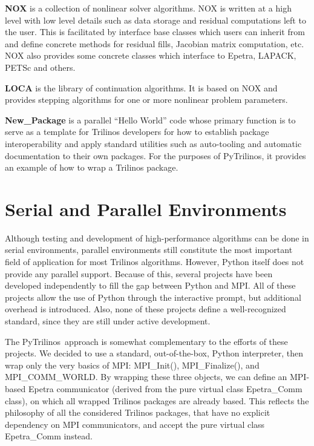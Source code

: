 \documentclass{llncs}
\newcommand{\PyTrilinos}{{\sc PyTrilinos}}
\begin{document}
\smallskip

\noindent
{\bf NOX} is a collection of nonlinear solver algorithms.  NOX
  is written at a high level with low level details such as data
  storage and residual computations left to the user.  This is
  facilitated by interface base classes which users can inherit from
  and define concrete methods for residual fills, Jacobian matrix
  computation, etc.  NOX also provides some concrete classes which
  interface to Epetra, LAPACK, PETSc and others.

\smallskip
\noindent
{\bf LOCA} is the library of continuation algorithms.  It is
  based on NOX and provides stepping algorithms for one or more
  nonlinear problem parameters.

\smallskip
\noindent
{\bf New\_Package} is a parallel ``Hello World'' code whose
  primary function is to serve as a template for Trilinos developers
  for how to establish package interoperability and apply standard
  utilities such as auto-tooling and
  automatic documentation to their own packages.  For the purposes of
  \PyTrilinos, it provides an example of how to wrap a Trilinos
  package.

\section{Serial and Parallel Environments}
\label{sec:serial}

Although testing and development of high-performance algorithms can be
done in serial environments, parallel environments still constitute
the most important field of application for most Trilinos algorithms.
However, Python itself does not provide any parallel support.  Because
of this, several projects have been developed independently to fill
the gap between Python and MPI.
All of these projects allow the use of Python through the interactive
prompt, but additional overhead is introduced.  Also, none of these
projects define a well-recognized standard, since they are still under
active development.

The \PyTrilinos\ approach is somewhat complementary to the efforts of these
projects.  We decided to use a standard, out-of-the-box, Python
interpreter, then wrap only the very basics of MPI: MPI\_Init(),
MPI\_Finalize(), and MPI\_COMM\_WORLD.  By wrapping these three
objects, we can define an MPI-based Epetra communicator (derived from
the pure virtual class Epetra\_Comm class), on which all wrapped
Trilinos packages are already based.  This reflects the philosophy of
all the considered Trilinos packages, that have no explicit dependency
on MPI communicators, and accept the pure virtual class Epetra\_Comm
instead.
\end{document}

